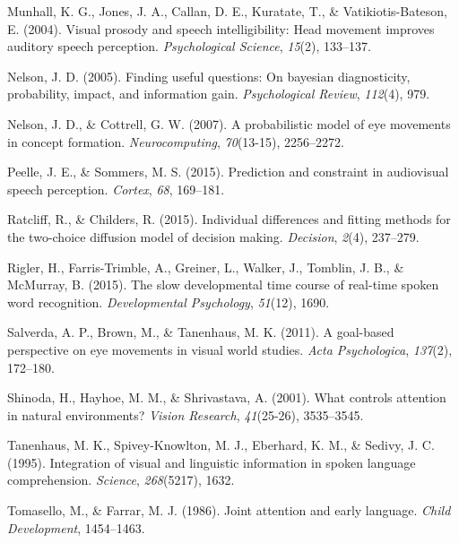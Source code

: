 \documentclass[,man,floatsintext]{apa6}
\begin{document}
\leavevmode\hypertarget{ref-munhall2004visual}{}%
Munhall, K. G., Jones, J. A., Callan, D. E., Kuratate, T., \& Vatikiotis-Bateson, E. (2004). Visual prosody and speech intelligibility: Head movement improves auditory speech perception. \emph{Psychological Science}, \emph{15}(2), 133--137.

\leavevmode\hypertarget{ref-nelson2005finding}{}%
Nelson, J. D. (2005). Finding useful questions: On bayesian diagnosticity, probability, impact, and information gain. \emph{Psychological Review}, \emph{112}(4), 979.

\leavevmode\hypertarget{ref-nelson2007probabilistic}{}%
Nelson, J. D., \& Cottrell, G. W. (2007). A probabilistic model of eye movements in concept formation. \emph{Neurocomputing}, \emph{70}(13-15), 2256--2272.

\leavevmode\hypertarget{ref-peelle2015prediction}{}%
Peelle, J. E., \& Sommers, M. S. (2015). Prediction and constraint in audiovisual speech perception. \emph{Cortex}, \emph{68}, 169--181.

\leavevmode\hypertarget{ref-ratcliff2015individual}{}%
Ratcliff, R., \& Childers, R. (2015). Individual differences and fitting methods for the two-choice diffusion model of decision making. \emph{Decision}, \emph{2}(4), 237--279.

\leavevmode\hypertarget{ref-rigler2015slow}{}%
Rigler, H., Farris-Trimble, A., Greiner, L., Walker, J., Tomblin, J. B., \& McMurray, B. (2015). The slow developmental time course of real-time spoken word recognition. \emph{Developmental Psychology}, \emph{51}(12), 1690.

\leavevmode\hypertarget{ref-salverda2011goal}{}%
Salverda, A. P., Brown, M., \& Tanenhaus, M. K. (2011). A goal-based perspective on eye movements in visual world studies. \emph{Acta Psychologica}, \emph{137}(2), 172--180.

\leavevmode\hypertarget{ref-shinoda2001controls}{}%
Shinoda, H., Hayhoe, M. M., \& Shrivastava, A. (2001). What controls attention in natural environments? \emph{Vision Research}, \emph{41}(25-26), 3535--3545.

\leavevmode\hypertarget{ref-tanenhaus1995integration}{}%
Tanenhaus, M. K., Spivey-Knowlton, M. J., Eberhard, K. M., \& Sedivy, J. C. (1995). Integration of visual and linguistic information in spoken language comprehension. \emph{Science}, \emph{268}(5217), 1632.

\leavevmode\hypertarget{ref-tomasello1986joint}{}%
Tomasello, M., \& Farrar, M. J. (1986). Joint attention and early language. \emph{Child Development}, 1454--1463.
\end{document}
